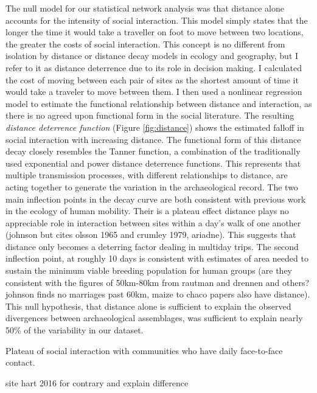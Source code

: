 \documentclass[11pt]{wlscirep}
\begin{document}
The null model for our statistical network analysis was that distance alone accounts for the intensity of social interaction. This model simply states that the longer the time it would take a traveller on foot to move between two locations, the greater the costs of social interaction. This concept is no different from isolation by distance or distance decay models in ecology and geography, but I refer to it as distance deterrence due to its role in decision making. I calculated the cost of moving between each pair of sites as the shortest amount of time it would take a traveler to move between them. I then used a nonlinear regression model to estimate the functional relationship between distance and interaction, as there is no agreed upon functional form in the social literature. 
The resulting \textit{distance deterrence function} (Figure \ref{fig:distance}) shows the estimated falloff in social interaction with increasing distance. The functional form of this distance decay closely resembles the Tanner function, a combination of the traditionally used exponential and power distance deterrence functions. This represents that multiple transmission processes, with different relationships to distance, are acting together to generate the variation in the archaeological record. The two main inflection points in the decay curve are both consistent with previous work in the ecology of human mobility. Their is a plateau effect distance plays no appreciable role in interaction between sites within a day's walk of one another (johnson but cites olsson 1965 and crumley 1979, ariadne). This suggests that distance only becomes a deterring factor dealing in multiday trips. The second inflection point, at roughly 10 days is consistent with estimates of area needed to sustain the minimum viable breeding population for human groups (are they consistent with the figures of 50km-80km from rautman and drennen and others? johnson finds no marriages past 60km, maize to chaco papers also have distance). This null hypothesis, that distance alone is sufficient to explain the observed divergences between archaeological assemblages, was sufficient to explain nearly 50\% of the variability in our dataset.  

Plateau of social interaction with communities who have daily face-to-face contact.

site hart 2016 for contrary and explain difference
\end{document}
